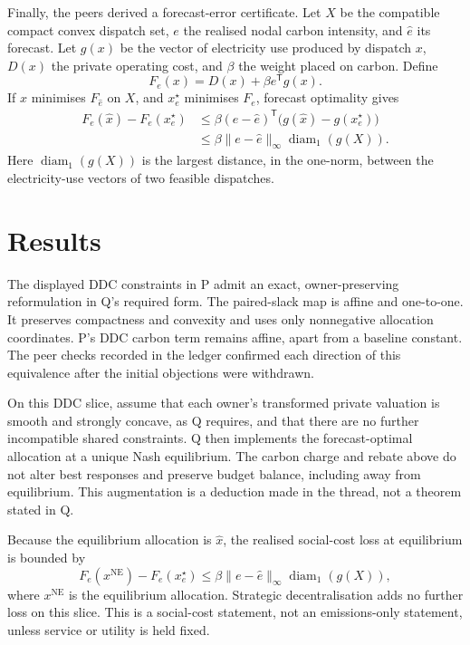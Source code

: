 \documentclass{article}
\begin{document}
Finally, the peers derived a forecast-error certificate.  Let \(X\) be the compatible compact convex dispatch set, \(e\) the realised nodal carbon intensity, and \(\widehat e\) its forecast.  Let \(g(x)\) be the vector of electricity use produced by dispatch \(x\), \(D(x)\) the private operating cost, and \(\beta\) the weight placed on carbon.  Define
\[
 F_e(x)=D(x)+\beta e^{\mathsf T}g(x).
\]
If \(\widehat x\) minimises \(F_{\widehat e}\) on \(X\), and \(x_e^\star\) minimises \(F_e\), forecast optimality gives
\begin{align*}
 F_e(\widehat x)-F_e(x_e^\star)
 &\leq \beta(e-\widehat e)^{\mathsf T}
 \bigl(g(\widehat x)-g(x_e^\star)\bigr)\\
 &\leq \beta\lVert e-\widehat e\rVert_\infty
 \operatorname{diam}_1(g(X)).
\end{align*}
Here \(\operatorname{diam}_1(g(X))\) is the largest distance, in the one-norm, between the electricity-use vectors of two feasible dispatches.

\section{Results}

The displayed DDC constraints in P admit an exact, owner-preserving reformulation in Q's required form.  The paired-slack map is affine and one-to-one.  It preserves compactness and convexity and uses only nonnegative allocation coordinates.  P's DDC carbon term remains affine, apart from a baseline constant.  The peer checks recorded in the ledger confirmed each direction of this equivalence after the initial objections were withdrawn.

On this DDC slice, assume that each owner's transformed private valuation is smooth and strongly concave, as Q requires, and that there are no further incompatible shared constraints.  Q then implements the forecast-optimal allocation at a unique Nash equilibrium.  The carbon charge and rebate above do not alter best responses and preserve budget balance, including away from equilibrium.  This augmentation is a deduction made in the thread, not a theorem stated in Q.

Because the equilibrium allocation is \(\widehat x\), the realised social-cost loss at equilibrium is bounded by
\[
 F_e(x^{\mathrm{NE}})-F_e(x_e^\star)
 \leq \beta\lVert e-\widehat e\rVert_\infty
 \operatorname{diam}_1(g(X)),
\]
where \(x^{\mathrm{NE}}\) is the equilibrium allocation.  Strategic decentralisation adds no further loss on this slice.  This is a social-cost statement, not an emissions-only statement, unless service or utility is held fixed.
\end{document}
